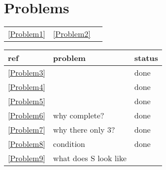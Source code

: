 \documentclass[11pt]{article}
\begin{document}
\section{Problems}
\label{sec:orgeb4752f}
\begin{center}
\begin{tabular}{lll}
\ref{Problem1} & \ref{Problem2} & \\
\end{tabular}
\end{center}

\begin{center}
\begin{tabular}{lll}
ref & problem & status\\
\hline
\ref{Problem3} &  & done\\
\ref{Problem4} &  & done\\
\ref{Problem5} &  & done\\
\ref{Problem6} & why complete? & done\\
\ref{Problem7} & why there only 3? & done\\
\ref{Problem8} & condition & done\\
\ref{Problem9} & what does S look like & \\
\end{tabular}
\end{center}

\label{bibliographystyle link}


\label{bibliography link}

\end{document}
